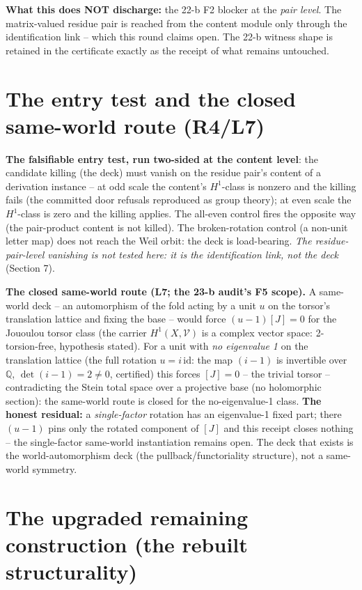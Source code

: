 \documentclass[11pt]{article}
\newcommand{\Q}{\mathbb Q}
\begin{document}
\textbf{What this does NOT discharge:} the 22-b F2 blocker at the
\emph{pair level}. The matrix-valued residue pair is reached from the
content module only through the identification link -- which this
round claims open. The 22-b witness shape is retained in the
certificate exactly as the receipt of what remains untouched.

\section{The entry test and the closed same-world route (R4/L7)}

\textbf{The falsifiable entry test, run two-sided at the content
level}: the candidate killing (the deck) must vanish on the residue
pair's content of a derivation instance -- at odd scale the content's
$H^1$-class is nonzero and the killing fails (the committed door
refusals reproduced as group theory); at even scale the $H^1$-class is
zero and the killing applies. The all-even control fires the opposite
way (the pair-product content is not killed). The broken-rotation
control (a non-unit letter map) does not reach the Weil orbit: the deck
is load-bearing. \emph{The residue-pair-level vanishing is not tested
here: it is the identification link, not the deck} (Section 7).

\textbf{The closed same-world route (L7; the 23-b audit's F5 scope).}
A same-world deck -- an automorphism of the fold acting by a unit $u$
on the torsor's translation lattice and fixing the base -- would force
$(u-1)[J]=0$ for the Jououlou torsor class (the carrier
$H^1(X,\mathcal V)$ is a complex vector space: 2-torsion-free,
hypothesis stated). For a unit with \emph{no eigenvalue 1} on the
translation lattice (the full rotation $u=i\,\mathrm{id}$: the map
$(i-1)$ is invertible over $\Q$, $\det(i-1)=2\ne0$, certified) this
forces $[J]=0$ -- the trivial torsor -- contradicting the Stein total
space over a projective base (no holomorphic section): the same-world
route is closed for the no-eigenvalue-1 class. \textbf{The honest
residual:} a \emph{single-factor} rotation has an eigenvalue-1 fixed
part; there $(u-1)$ pins only the rotated component of $[J]$ and this
receipt closes nothing -- the single-factor same-world instantiation
remains open. The deck that exists is the world-automorphism deck (the
pullback/functoriality structure), not a same-world symmetry.

\section{The upgraded remaining construction (the rebuilt structurality)}
\end{document}
